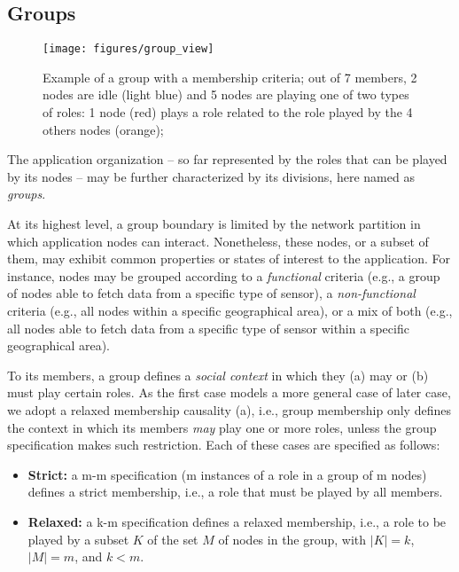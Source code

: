 
\subsection{Groups}\label{sec:groups}

\begin{figure}[t!]
	\centering
	\texttt{[image: figures/group\_view]}
	\caption{Example of a group with a  membership criteria; out of 7 members, 2 nodes are idle (light blue) and 5 nodes are playing one of two types of roles: 1 node (red) plays a role related to the role played by the 4 others nodes (orange);}
	\label{fig:group_view}
\end{figure}

The application organization -- so far represented by the roles that can be played by its nodes -- may be further characterized by its divisions, here named as \textit{groups}. 

At its highest level, a group boundary is limited by the network partition in which application nodes can interact. Nonetheless, these nodes, or a subset of them, may exhibit common properties or states of interest to the application. For instance, nodes may be grouped according to a \textit{functional} criteria (e.g., a group of nodes able to fetch data from a specific type of sensor), a \textit{non-functional} criteria (e.g., all nodes within a specific geographical area), or a mix of both (e.g., all nodes able to fetch data from a specific type of sensor within a specific geographical area). 


To its members, a group defines a \textit{social context} in which they (a) may or (b) must play certain roles. As the first case models a more general case of later case, we adopt a relaxed membership causality (a), i.e., group membership only defines the context in which its members \textit{may} play one or more roles, unless the group specification makes such restriction. Each of these cases are specified as follows:

\begin{itemize}
	
	\item \textbf{Strict:} a m-m specification (m instances of a role in a group of m nodes) defines a strict membership, i.e., a role that must be played by all members.
	
	\item \textbf{Relaxed:} a k-m specification defines a relaxed membership, i.e., a role to be played by a subset $K$ of the set $M$ of nodes in the group, with $|K| = k$, $|M| = m$, and $k < m$.
	
\end{itemize}

